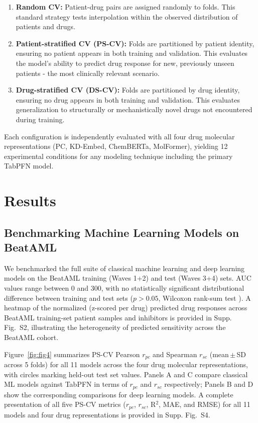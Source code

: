 \documentclass[pdflatex,sn-mathphys-num]{sn-jnl}
\theoremstyle{thmstyleone}
\theoremstyle{thmstyletwo}
\theoremstyle{thmstylethree}
\begin{document}
\begin{enumerate}
    \item \textbf{Random CV:} Patient-drug pairs are assigned randomly to folds. This standard strategy tests interpolation within the observed distribution of patients and drugs.
    \item \textbf{Patient-stratified CV (PS-CV):} Folds are partitioned by patient identity, ensuring no patient appears in both training and validation. This evaluates the model's ability to predict drug response for new, previously unseen patients - the most clinically relevant scenario.
    \item \textbf{Drug-stratified CV (DS-CV):} Folds are partitioned by drug identity, ensuring no drug appears in both training and validation. This evaluates generalization to structurally or mechanistically novel drugs not encountered during training.
\end{enumerate}

Each configuration is independently evaluated with all four drug molecular representations (PC, KD-Embed, ChemBERTa, MolFormer), yielding 12 experimental conditions for any modeling technique including the primary TabPFN model.

\section{Results}\label{sec3}

\subsection{Benchmarking Machine Learning Models on BeatAML}\label{sec3.1}
We benchmarked the full suite of classical machine learning and deep learning models on the BeatAML training (Waves 1+2) and test (Waves 3+4) sets. AUC values range between 0 and 300, with no statistically significant distributional difference between training and test sets ($p > 0.05$, Wilcoxon rank-sum test \cite{mann1947test}). A heatmap of the normalized (z-scored per drug) predicted drug responses across BeatAML training-set patient samples and inhibitors is provided in Supp. Fig.~S2, illustrating the heterogeneity of predicted sensitivity across the BeatAML cohort.

Figure~\ref{fig:fig4} summarizes PS-CV Pearson $r_{pc}$ and Spearman $r_{sc}$ (mean\,$\pm$\,SD across 5 folds) for all 11 models across the four drug molecular representations, with circles marking held-out test set values. Panels A and C compare classical ML models against TabPFN in terms of $r_{pc}$ and $r_{sc}$ respectively; Panels B and D show the corresponding comparisons for deep learning models. A complete presentation of all five PS-CV metrics ($r_{pc}$, $r_{sc}$, R$^2$, MAE, and RMSE) for all 11 models and four drug representations is provided in Supp. Fig.~S4.
\end{document}
